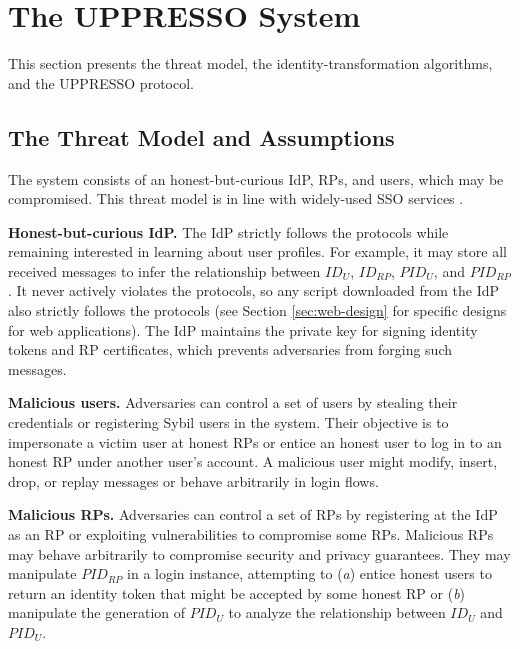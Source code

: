 \section{The UPPRESSO System}
\label{sec:UPPRESSO}

This section presents the threat model, the identity-transformation algorithms, and the UPPRESSO protocol.

\subsection{The Threat Model and Assumptions}
\label{subsec:threatmodel}
The system consists of an honest-but-curious IdP, RPs, and users, which may be compromised. %
This threat model is in line with widely-used SSO services \cite{OpenIDConnect,rfc6749, SAML, SAMLIdentifier, NIST2017draft}.

\noindent \textbf{Honest-but-curious IdP.} The IdP strictly follows the protocols while remaining interested in learning about user profiles.
For example, it may store all received messages to infer the relationship between $ID_U$, $ID_{RP}$, $PID_{U}$, and $PID_{RP}$.
It never actively violates the protocols, so any script downloaded from the IdP also strictly follows the protocols (see Section \ref{sec:web-design} for specific designs for web applications). The IdP maintains the private key for signing identity tokens and RP certificates, %
which prevents adversaries from forging such messages.

\noindent \textbf{Malicious users.} Adversaries can control a set of users by stealing their credentials or registering Sybil users in the system. Their objective is to impersonate a victim user at honest RPs or entice an honest user to log in to an honest RP under another user's account.
A malicious user might modify, insert, drop, or replay messages or behave arbitrarily in login flows.

\noindent \textbf{Malicious RPs.}
Adversaries can control a set of RPs by registering at the IdP as an RP or exploiting vulnerabilities to compromise some RPs. Malicious RPs may behave arbitrarily to compromise security and privacy guarantees.
They may manipulate $PID_{RP}$ in a login instance, attempting to (\emph{a}) entice honest users to return an identity token that might be accepted by some honest RP or (\emph{b}) manipulate the generation of $PID_U$ to analyze the relationship between $ID_U$ and $PID_U$.


